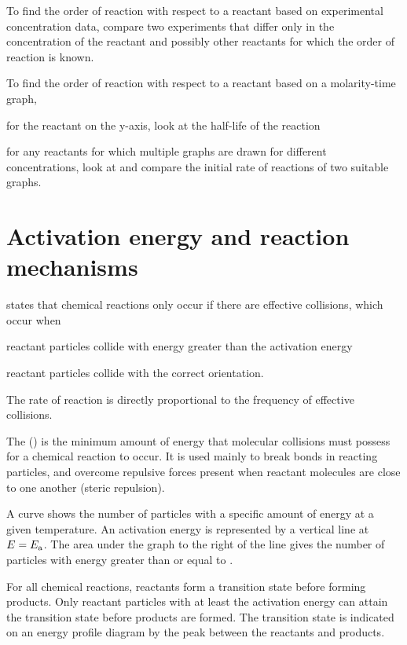 \documentclass[Chemistry.tex]{subfiles}
\begin{document}
To find the order of reaction with respect to a reactant based on experimental concentration data, compare two experiments that differ only in the concentration of the reactant and possibly other reactants for which the order of reaction is known.

To find the order of reaction with respect to a reactant based on a molarity-time graph, \begin{slinenum}
\item for the reactant on the y-axis, look at the half-life of the reaction
\item for any reactants for which multiple graphs are drawn for different concentrations, look at and compare the initial rate of reactions of two suitable graphs.
\end{slinenum}
\section{Activation energy and reaction mechanisms}
 states that chemical reactions only occur if there are effective collisions, which occur when \begin{slinenum}
\item reactant particles collide with energy greater than the activation energy \slEa{}
\item reactant particles collide with the correct orientation.\end{slinenum}

The rate of reaction is directly proportional to the frequency of effective collisions.

The  (\slEa{}) is the minimum amount of energy that molecular collisions must possess for a chemical reaction to occur. It is used mainly to break bonds in reacting particles, and overcome repulsive forces present when reactant molecules are close to one another (steric repulsion).

A  curve shows the number of particles with a specific amount of energy at a given temperature. An activation energy is represented by a vertical line at \(E = \slEa\). The area under the graph to the right of the line gives the number of particles with energy greater than or equal to \slEa{}.

For all chemical reactions, reactants form a transition state before forming products. Only reactant particles with at least the activation energy can attain the transition state before products are formed. The transition state is indicated on an energy profile diagram by the peak between the reactants and products.
\end{document}
